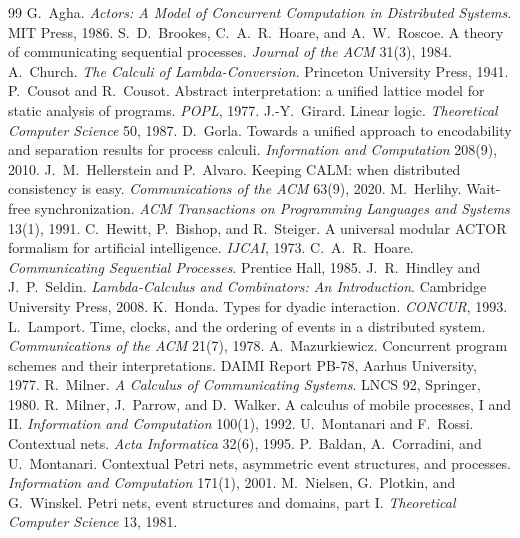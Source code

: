 \documentclass[11pt,openany]{book}
\theoremstyle{remark}
\begin{document}
\backmatter
\begin{thebibliography}{99}
 G.~Agha. \emph{Actors: A Model of Concurrent Computation in Distributed Systems}. MIT Press, 1986.
 S.~D.~Brookes, C.~A.~R.~Hoare, and A.~W.~Roscoe. A theory of communicating sequential processes. \emph{Journal of the ACM} 31(3), 1984.
 A.~Church. \emph{The Calculi of Lambda-Conversion}. Princeton University Press, 1941.
 P.~Cousot and R.~Cousot. Abstract interpretation: a unified lattice model for static analysis of programs. \emph{POPL}, 1977.
 J.-Y.~Girard. Linear logic. \emph{Theoretical Computer Science} 50, 1987.
 D.~Gorla. Towards a unified approach to encodability and separation results for process calculi. \emph{Information and Computation} 208(9), 2010.
 J.~M.~Hellerstein and P.~Alvaro. Keeping CALM: when distributed consistency is easy. \emph{Communications of the ACM} 63(9), 2020.
 M.~Herlihy. Wait-free synchronization. \emph{ACM Transactions on Programming Languages and Systems} 13(1), 1991.
 C.~Hewitt, P.~Bishop, and R.~Steiger. A universal modular ACTOR formalism for artificial intelligence. \emph{IJCAI}, 1973.
 C.~A.~R.~Hoare. \emph{Communicating Sequential Processes}. Prentice Hall, 1985.
 J.~R.~Hindley and J.~P.~Seldin. \emph{Lambda-Calculus and Combinators: An Introduction}. Cambridge University Press, 2008.
 K.~Honda. Types for dyadic interaction. \emph{CONCUR}, 1993.
 L.~Lamport. Time, clocks, and the ordering of events in a distributed system. \emph{Communications of the ACM} 21(7), 1978.
 A.~Mazurkiewicz. Concurrent program schemes and their interpretations. DAIMI Report PB-78, Aarhus University, 1977.
 R.~Milner. \emph{A Calculus of Communicating Systems}. LNCS 92, Springer, 1980.
 R.~Milner, J.~Parrow, and D.~Walker. A calculus of mobile processes, I and II. \emph{Information and Computation} 100(1), 1992.
 U.~Montanari and F.~Rossi. Contextual nets. \emph{Acta Informatica} 32(6), 1995.
 P.~Baldan, A.~Corradini, and U.~Montanari. Contextual Petri nets, asymmetric event structures, and processes. \emph{Information and Computation} 171(1), 2001.
 M.~Nielsen, G.~Plotkin, and G.~Winskel. Petri nets, event structures and domains, part I. \emph{Theoretical Computer Science} 13, 1981.

\end{thebibliography}
\end{document}
